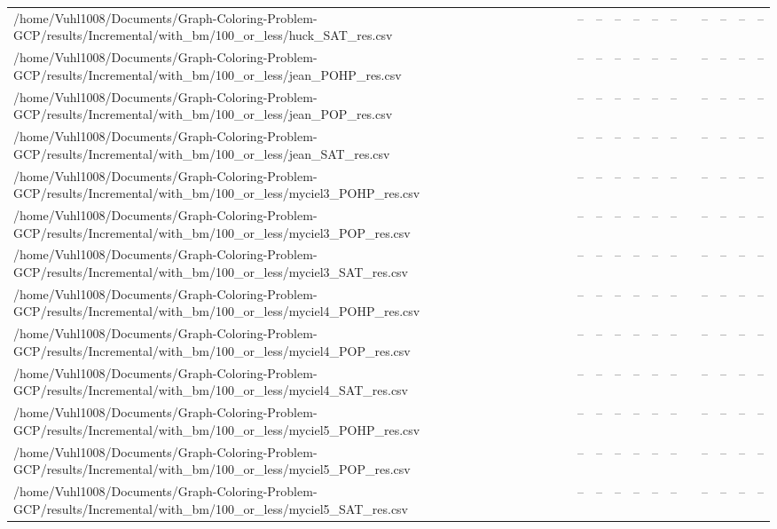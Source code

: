 \begin{table}[htbp]
\begin{tabular}{llllllllllll}
/home/Vuhl1008/Documents/Graph-Coloring-Problem-GCP/results/Incremental/with\_bm/100\_or\_less/huck\_SAT\_res.csv & -- & -- & -- & -- & -- & -- & {} & -- & -- & -- & -- \\
/home/Vuhl1008/Documents/Graph-Coloring-Problem-GCP/results/Incremental/with\_bm/100\_or\_less/jean\_POHP\_res.csv & -- & -- & -- & -- & -- & -- & {} & -- & -- & -- & -- \\
/home/Vuhl1008/Documents/Graph-Coloring-Problem-GCP/results/Incremental/with\_bm/100\_or\_less/jean\_POP\_res.csv & -- & -- & -- & -- & -- & -- & {} & -- & -- & -- & -- \\
/home/Vuhl1008/Documents/Graph-Coloring-Problem-GCP/results/Incremental/with\_bm/100\_or\_less/jean\_SAT\_res.csv & -- & -- & -- & -- & -- & -- & {} & -- & -- & -- & -- \\
/home/Vuhl1008/Documents/Graph-Coloring-Problem-GCP/results/Incremental/with\_bm/100\_or\_less/myciel3\_POHP\_res.csv & -- & -- & -- & -- & -- & -- & {} & -- & -- & -- & -- \\
/home/Vuhl1008/Documents/Graph-Coloring-Problem-GCP/results/Incremental/with\_bm/100\_or\_less/myciel3\_POP\_res.csv & -- & -- & -- & -- & -- & -- & {} & -- & -- & -- & -- \\
/home/Vuhl1008/Documents/Graph-Coloring-Problem-GCP/results/Incremental/with\_bm/100\_or\_less/myciel3\_SAT\_res.csv & -- & -- & -- & -- & -- & -- & {} & -- & -- & -- & -- \\
/home/Vuhl1008/Documents/Graph-Coloring-Problem-GCP/results/Incremental/with\_bm/100\_or\_less/myciel4\_POHP\_res.csv & -- & -- & -- & -- & -- & -- & {} & -- & -- & -- & -- \\
/home/Vuhl1008/Documents/Graph-Coloring-Problem-GCP/results/Incremental/with\_bm/100\_or\_less/myciel4\_POP\_res.csv & -- & -- & -- & -- & -- & -- & {} & -- & -- & -- & -- \\
/home/Vuhl1008/Documents/Graph-Coloring-Problem-GCP/results/Incremental/with\_bm/100\_or\_less/myciel4\_SAT\_res.csv & -- & -- & -- & -- & -- & -- & {} & -- & -- & -- & -- \\
/home/Vuhl1008/Documents/Graph-Coloring-Problem-GCP/results/Incremental/with\_bm/100\_or\_less/myciel5\_POHP\_res.csv & -- & -- & -- & -- & -- & -- & {} & -- & -- & -- & -- \\
/home/Vuhl1008/Documents/Graph-Coloring-Problem-GCP/results/Incremental/with\_bm/100\_or\_less/myciel5\_POP\_res.csv & -- & -- & -- & -- & -- & -- & {} & -- & -- & -- & -- \\
/home/Vuhl1008/Documents/Graph-Coloring-Problem-GCP/results/Incremental/with\_bm/100\_or\_less/myciel5\_SAT\_res.csv & -- & -- & -- & -- & -- & -- & {} & -- & -- & -- & -- \\

\end{tabular}
\end{table}
